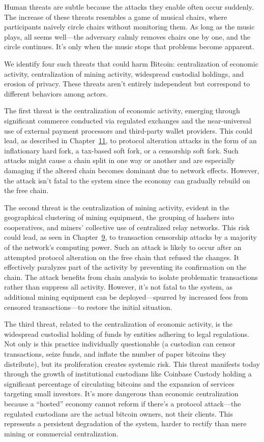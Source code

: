 \documentclass[
  a5paper,
  smalldemyvopaper,10pt,twoside,onecolumn,openright,extrafontsizes,hidelinks]{memoir}
\begin{document}
Human threats are subtle because the attacks they enable often occur
suddenly. The increase of these threats resembles a game of musical
chairs, where participants naively circle chairs without monitoring
them. As long as the music plays, all seems well---the adversary calmly
removes chairs one by one, and the circle continues. It's only when the
music stops that problems become apparent.

We identify four such threats that could harm Bitcoin: centralization of
economic activity, centralization of mining activity, widespread
custodial holdings, and erosion of privacy. These threats aren't
entirely independent but correspond to different behaviors among actors.

The first threat is the centralization of economic activity, emerging
through significant commerce conducted via regulated exchanges and the
near-universal use of external payment processors and third-party wallet
providers. This could lead, as described in
Chapter~\hyperref[ch:determination]{11}, to protocol alteration attacks
in the form of an inflationary hard fork, a tax-based soft fork, or a
censorship soft fork. Such attacks might cause a chain split in one way
or another and are especially damaging if the altered chain becomes
dominant due to network effects. However, the attack isn't fatal to the
system since the economy can gradually rebuild on the free chain.

The second threat is the centralization of mining activity, evident in
the geographical clustering of mining equipment, the grouping of hashers
into cooperatives, and miners' collective use of centralized relay
networks. This risk could lead, as seen in
Chapter~\hyperref[ch:censure]{9}, to transaction censorship attacks by a
majority of the network's computing power. Such an attack is likely to
occur after an attempted protocol alteration on the free chain that
refused the changes. It effectively paralyzes part of the activity by
preventing its confirmation on the chain. The attack benefits from chain
analysis to isolate problematic transactions rather than suppress all
activity. However, it's not fatal to the system, as additional mining
equipment can be deployed---spurred by increased fees from censored
transactions---to restore the initial situation.

The third threat, related to the centralization of economic activity, is
the widespread custodial holding of funds by entities adhering to legal
regulations. Not only is this practice individually questionable (a
custodian can censor transactions, seize funds, and inflate the number
of paper bitcoins they distribute), but its proliferation creates
systemic risk. This threat manifests today through the growth of
institutional custodians like Coinbase Custody holding a significant
percentage of circulating bitcoins and the expansion of services
targeting small investors. It's more dangerous than economic
centralization because a ``hosted'' economy cannot reform if there's a
protocol attack---the regulated custodians are the actual bitcoin
owners, not their clients. This represents a persistent degradation of
the system, harder to rectify than mere mining or commercial
centralization.
\end{document}
